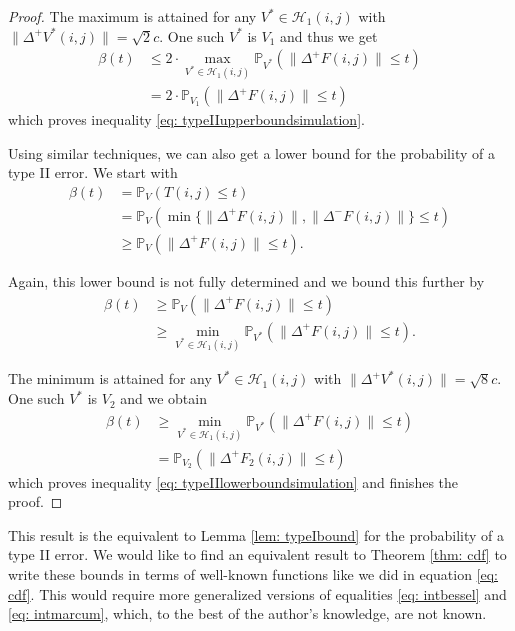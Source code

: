 \documentclass[a4paper,12pt]{article}
\newcommand{\norm}[1]{\lVert#1\rVert}
\theoremstyle{plain}
\theoremstyle{definition}
\begin{document}
\begin{proof}
	The maximum is attained for any $V^* \in \mathcal{H}_1(i, j)$ with $\norm{\Delta^+ V^*(i, j)} = \sqrt{2} c$. One such $V^*$ is $V_1$ and thus we get
	\begin{align*}
		\beta(t) &\leq 2 \cdot \max_{V^* \in \mathcal{H}_1(i, j)} \mathbb{P}_{V^*}\left( \norm{\Delta^+ F(i, j)} \leq t \right) \\
		&= 2 \cdot \mathbb{P}_{V_1}\left( \norm{\Delta^+ F(i, j)} \leq t \right)
	\end{align*}
	which proves inequality \eqref{eq: typeIIupperboundsimulation}.
	
	Using similar techniques, we can also get a lower bound for the probability of a type II error. We start with
	\begin{align*}
		\beta(t) &= \mathbb{P}_V\left( T(i, j) \leq t \right) \\
		&= \mathbb{P}_V\left( \min \{ \norm{\Delta^+ F(i, j)}, \norm{\Delta^- F(i, j)} \} \leq t \right) \\
		&\geq \mathbb{P}_V\left( \norm{\Delta^+ F(i, j)} \leq t \right).
	\end{align*}
	
	Again, this lower bound is not fully determined and we bound this further by
	\begin{align*}
		\beta(t) &\geq \mathbb{P}_V\left( \norm{\Delta^+ F(i, j)} \leq t \right) \\
		&\geq \min_{V^* \in \mathcal{H}_1(i, j)} \mathbb{P}_{V^*}\left( \norm{\Delta^+ F(i, j)} \leq t \right).
	\end{align*}
	
	The minimum is attained for any $V^* \in \mathcal{H}_1(i, j)$ with $\norm{\Delta^+ V^*(i, j)} = \sqrt{8} c$. One such $V^*$ is $V_2$ and we obtain
	\begin{align*}
		\beta(t) &\geq \min_{V^* \in \mathcal{H}_1(i, j)} \mathbb{P}_{V^*}\left( \norm{\Delta^+ F(i, j)} \leq t \right) \\
		&= \mathbb{P}_{V_2}\left( \norm{\Delta^+ F_2(i, j)} \leq t \right)
	\end{align*}
	which proves inequality \eqref{eq: typeIIlowerboundsimulation} and finishes the proof.
\end{proof}

This result is the equivalent to Lemma \ref{lem: typeIbound} for the probability of a type II error. We would like to find an equivalent result to Theorem \ref{thm: cdf} to write these bounds in terms of well-known functions like we did in equation \eqref{eq: cdf}. This would require more generalized versions of equalities \eqref{eq: intbessel} and \eqref{eq: intmarcum}, which, to the best of the author's knowledge, are not known.
\end{document}
